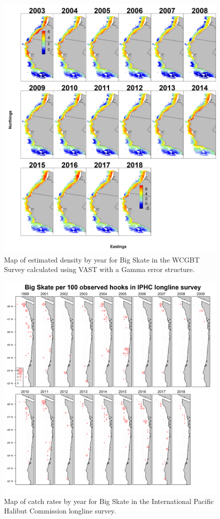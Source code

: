 \documentclass[]{article}
\begin{document}
\begin{figure}
\centering
\includegraphics{Figures/VAST_Yearly_Dens_WCGBTS.png}
\caption{Map of estimated density by year for Big Skate in the WCGBT
Survey calculated using VAST with a Gamma error structure.
\label{fig:VAST_Yearly_Dens_WCGBTS}}
\end{figure}

\begin{figure}
\centering
\includegraphics{Figures/IPHC_BigSkate_map.png}
\caption{Map of catch rates by year for Big Skate in the International
Pacific Halibut Commission longline survey. \label{fig:IPHC_map}}
\end{figure}

\FloatBarrier

\FloatBarrier

\FloatBarrier

\FloatBarrier

\FloatBarrier

\FloatBarrier
\end{document}
